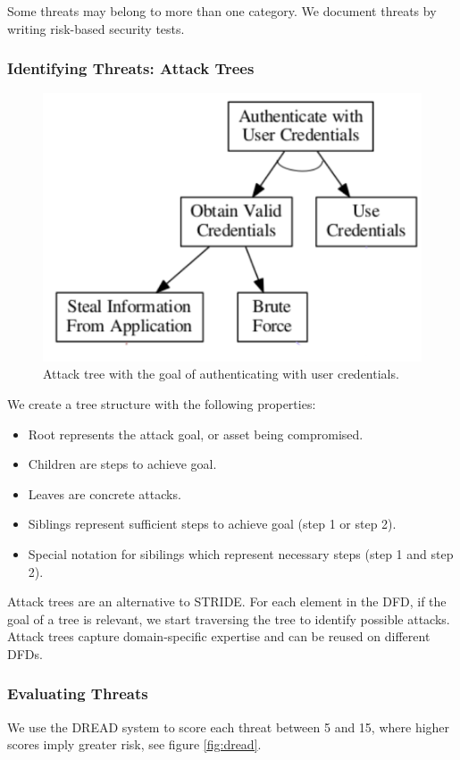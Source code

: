 \documentclass[11pt]{article}
\begin{document}
Some threats may belong to more than one category.
We document threats by writing risk-based security tests.

\subsubsection{Identifying Threats: Attack Trees}
\begin{figure}[htb!]
  \centering
  \caption{Attack tree with the goal of authenticating with user credentials.}
  \includegraphics[scale=0.3]{attacktree}
\end{figure}
We create a tree structure with the following properties:
\begin{itemize}
  \item Root represents the attack goal, or asset being compromised.
  \item Children are steps to achieve goal.
  \item Leaves are concrete attacks.
  \item Siblings represent sufficient steps to achieve goal (step 1 or step 2).
  \item Special notation for sibilings which represent necessary steps (step 1 and step 2).
\end{itemize}

Attack trees are an alternative to STRIDE.
For each element in the DFD, if the goal of a tree is relevant, we start traversing the tree to identify possible attacks.
Attack trees capture domain-specific expertise and can be reused on different DFDs.

\subsubsection{Evaluating Threats}
We use the DREAD system to score each threat between 5 and 15, where higher scores imply greater risk, see figure \ref{fig:dread}.
\end{document}
